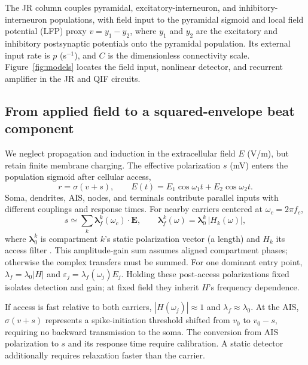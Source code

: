 \documentclass[a4paper]{article}
\newcommand{\Sig}{\sigma}
\begin{document}
The JR column couples pyramidal, excitatory-interneuron, and inhibitory-interneuron
populations, with field input to the pyramidal sigmoid and local field potential
(LFP) proxy $v=y_1-y_2$, where $y_1$ and $y_2$ are the excitatory and inhibitory
postsynaptic potentials onto the pyramidal population. Its external input rate is
$p$ (s$^{-1}$), and $C$ is the dimensionless connectivity scale.
Figure~\ref{fig:models} locates the field input, nonlinear detector, and
recurrent amplifier in the JR and QIF circuits.


\subsection{From applied field to a squared-envelope beat component}\label{sec:coupling}
We neglect propagation and induction in the extracellular field $E$ (V/m),
but retain finite membrane charging. The effective polarization $s$ (mV)
enters the population sigmoid after cellular access,
\begin{equation}
r=\Sig(v+s),\qquad
E(t)=E_1\cos\omega_1 t+E_2\cos\omega_2 t .
\label{eq:coupling}
\end{equation}
Soma, dendrites, AIS, nodes, and terminals contribute parallel inputs with
different couplings and response times. For nearby carriers centered at
$\omega_c=2\pi f_c$,
\begin{equation}
s\simeq\sum_k \boldsymbol\lambda^k_f(\omega_c)\!\cdot\!\mathbf E,\qquad
\boldsymbol\lambda^k_f(\omega)=\boldsymbol\lambda^k_0\,\lvert H_k(\omega)\rvert,
\label{eq:doors}
\end{equation}
where $\boldsymbol\lambda^k_0$ is compartment $k$'s static polarization vector
(a length) and $H_k$ its access filter \cite{ruffini2025rosetta,galangadea2023}.
This amplitude-gain sum assumes aligned compartment phases; otherwise the
complex transfers must be summed. For one dominant entry point,
$\lambda_f=\lambda_0|H|$ and $\varepsilon_j=\lambda_f(\omega_j)E_j$.
Holding these post-access polarizations fixed isolates detection and gain;
at fixed field they inherit $H$'s frequency dependence.

If access is fast relative to both carriers, $|H(\omega_j)|\approx1$ and
$\lambda_f\approx\lambda_0$. At the AIS,
$\Sig(v+s)$ represents a spike-initiation threshold shifted from $v_0$ to
$v_0-s$, requiring no backward transmission to the soma. The conversion from
AIS polarization to $s$ and its response time require calibration. A static
detector additionally requires relaxation faster than the carrier.
\end{document}
